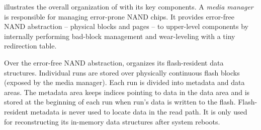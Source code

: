  illustrates the overall organization of \ours{}
with its key components.
A \textit{media manager} is responsible for managing error-prone NAND
chips. It provides error-free NAND abstraction -- physical blocks 
and pages -- to upper-level components by internally performing bad-block 
management and  wear-leveling with a tiny redirection table. 

Over the error-free NAND abstraction, 
\ours{} organizes its flash-resident data structures.
Individual runs are stored over physically continuous flash blocks (exposed by
the media manager). Each run is divided into metadata and data areas.
The metadata area keeps indices pointing to data in the data area
and is stored at the beginning of each run when
run's data is written to the flash.  
Flash-resident metadata is never used to locate data in the read path.  
It is only used for reconstructing its in-memory data
structures after system reboots.

